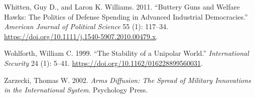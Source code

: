 \documentclass[
]{article}
\newlength{\cslhangindent}
\newlength{\cslentryspacingunit} %
\newenvironment{CSLReferences}[2] %
 {%
  \setlength{\parindent}{0pt}
  \ifodd #1
  \let\oldpar\par
  \def\par{\hangindent=\cslhangindent\oldpar}
  \fi
  \setlength{\parskip}{#2\cslentryspacingunit}
 }%
 {}
\begin{document}
\begin{CSLReferences}{1}{0}
\leavevmode{}%
Whitten, Guy D., and Laron K. Williams. 2011. {``Buttery {Guns} and {Welfare Hawks}: {The Politics} of {Defense Spending} in {Advanced Industrial Democracies}.''} \emph{American Journal of Political Science} 55 (1): 117--34. \url{https://doi.org/10.1111/j.1540-5907.2010.00479.x}.

\leavevmode{}%
Wohlforth, William C. 1999. {``The {Stability} of a {Unipolar World}.''} \emph{International Security} 24 (1): 5--41. \url{https://doi.org/10.1162/016228899560031}.

\leavevmode{}%
Zarzecki, Thomas W. 2002. \emph{Arms {Diffusion}: {The Spread} of {Military Innovations} in the {International System}}. {Psychology Press}.

\end{CSLReferences}
\end{document}

